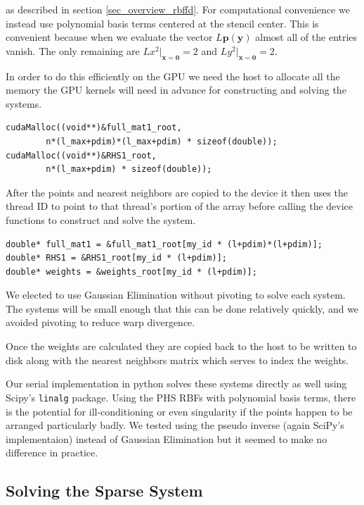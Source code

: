 \documentclass[12pt]{article}
\let\vec\mathbf
\begin{document}
	\noindent as described in section \ref{sec_overview_rbffd}. For computational convenience we instead use polynomial basis terms centered at the stencil center. This is convenient because when we evaluate the vector $L\vec{p}(\vec{y})$ almost all of the entries vanish. The only remaining are $Lx^2\vert_{\vec{x}=\vec{0}} = 2$ and $Ly^2\vert_{\vec{x}=\vec{0}} = 2$.
	
	In order to do this efficiently on the GPU we need the host to allocate all the memory the GPU kernels will need in advance for constructing and solving the systems. 
	
	\begin{lstlisting}
cudaMalloc((void**)&full_mat1_root, 
		n*(l_max+pdim)*(l_max+pdim) * sizeof(double));
cudaMalloc((void**)&RHS1_root, 
		n*(l_max+pdim) * sizeof(double));
	\end{lstlisting}
	
	\noindent After the points and nearest neighbors are copied to the device it then uses the thread ID to point to that thread's portion of the array before calling the device functions to construct and solve the system.
	
	\begin{lstlisting}
double* full_mat1 = &full_mat1_root[my_id * (l+pdim)*(l+pdim)];
double* RHS1 = &RHS1_root[my_id * (l+pdim)];
double* weights = &weights_root[my_id * (l+pdim)];
	\end{lstlisting}
	
	We elected to use Gaussian Elimination without pivoting to solve each system. The systems will be small enough that this can be done relatively quickly, and we avoided pivoting to reduce warp divergence. 
	
	Once the weights are calculated they are copied back to the host to be written to disk along with the nearest neighbors matrix which serves to index the weights.
	
	Our serial implementation in python solves these systems directly as well using Scipy's \texttt{linalg} package. Using the PHS RBFs with polynomial basis terms, there is the potential for ill-conditioning or even singularity if the points happen to be arranged particularly badly. We tested using the pseudo inverse (again SciPy's implementaion) instead of Gaussian Elimination but it seemed to make no difference in practice.

\subsection{Solving the Sparse System}
\end{document}
